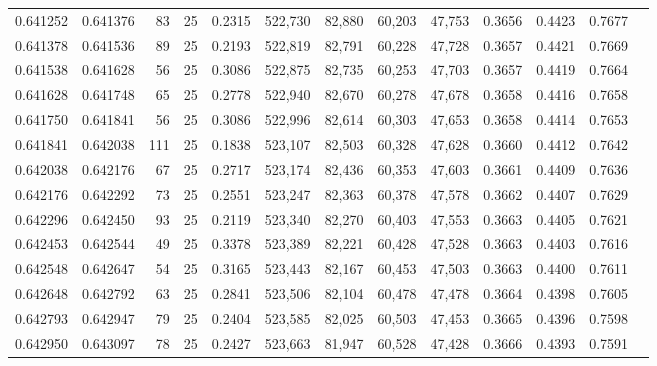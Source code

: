 \begin{tabular}{rrrrrrrrrrrrr}
0.641252 & 0.641376 &    83 &  25 &                                     0.2315 & 522,730 &  82,880 &  60,203 &  47,753 & 0.3656 & 0.4423 & 0.7677 \\
0.641378 & 0.641536 &    89 &  25 &                                     0.2193 & 522,819 &  82,791 &  60,228 &  47,728 & 0.3657 & 0.4421 & 0.7669 \\
0.641538 & 0.641628 &    56 &  25 &                                     0.3086 & 522,875 &  82,735 &  60,253 &  47,703 & 0.3657 & 0.4419 & 0.7664 \\
0.641628 & 0.641748 &    65 &  25 &                                     0.2778 & 522,940 &  82,670 &  60,278 &  47,678 & 0.3658 & 0.4416 & 0.7658 \\
0.641750 & 0.641841 &    56 &  25 &                                     0.3086 & 522,996 &  82,614 &  60,303 &  47,653 & 0.3658 & 0.4414 & 0.7653 \\
0.641841 & 0.642038 &   111 &  25 &                                     0.1838 & 523,107 &  82,503 &  60,328 &  47,628 & 0.3660 & 0.4412 & 0.7642 \\
0.642038 & 0.642176 &    67 &  25 &                                     0.2717 & 523,174 &  82,436 &  60,353 &  47,603 & 0.3661 & 0.4409 & 0.7636 \\
0.642176 & 0.642292 &    73 &  25 &                                     0.2551 & 523,247 &  82,363 &  60,378 &  47,578 & 0.3662 & 0.4407 & 0.7629 \\
0.642296 & 0.642450 &    93 &  25 &                                     0.2119 & 523,340 &  82,270 &  60,403 &  47,553 & 0.3663 & 0.4405 & 0.7621 \\
0.642453 & 0.642544 &    49 &  25 &                                     0.3378 & 523,389 &  82,221 &  60,428 &  47,528 & 0.3663 & 0.4403 & 0.7616 \\
0.642548 & 0.642647 &    54 &  25 &                                     0.3165 & 523,443 &  82,167 &  60,453 &  47,503 & 0.3663 & 0.4400 & 0.7611 \\
0.642648 & 0.642792 &    63 &  25 &                                     0.2841 & 523,506 &  82,104 &  60,478 &  47,478 & 0.3664 & 0.4398 & 0.7605 \\
0.642793 & 0.642947 &    79 &  25 &                                     0.2404 & 523,585 &  82,025 &  60,503 &  47,453 & 0.3665 & 0.4396 & 0.7598 \\
0.642950 & 0.643097 &    78 &  25 &                                     0.2427 & 523,663 &  81,947 &  60,528 &  47,428 & 0.3666 & 0.4393 & 0.7591 \\

\end{tabular}
